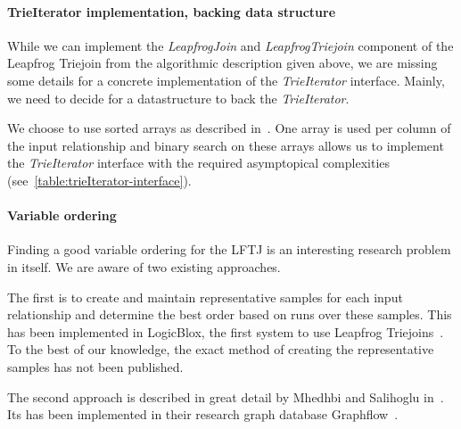 \paragraph{TrieIterator implementation, backing data structure}
While we can implement the \textit{LeapfrogJoin} and \textit{LeapfrogTriejoin} component of the Leapfrog Triejoin from the
algorithmic description given above, we are missing some details for a concrete implementation of the
\textit{TrieIterator} interface.
Mainly, we need to decide for a datastructure to back the \textit{TrieIterator}.

We choose to use sorted arrays as described in~\cite{myria-detailed}.
One array is used per column of the input relationship and binary search on these arrays allows us to implement the \textit{TrieIterator}
interface with the required asymptopical complexities (see~\cref{table:trieIterator-interface}).


\paragraph{Variable ordering}  %
Finding a good variable ordering for the \textsc{LFTJ} is an interesting research problem in itself.
We are aware of two existing approaches.

The first is to create and maintain representative samples for each input relationship and determine the best order based on runs over
these samples.
This has been implemented in LogicBlox, the first system to use Leapfrog Triejoins~\cite{logicBlox}.
To the best of our knowledge, the exact method of creating the representative samples has not been published.

The second approach is described in great detail by Mhedhbi and Salihoglu in~\cite{mhedhbi2019}.
Its has been implemented in their research graph database Graphflow~\cite{graphflow}.

